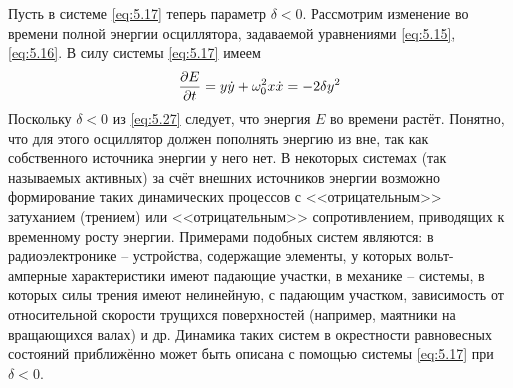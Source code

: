 Пусть в системе \eqref{eq:5.17} теперь параметр $\delta<0$. Рассмотрим изменение во времени полной энергии осциллятора, задаваемой уравнениями \eqref{eq:5.15}, \eqref{eq:5.16}. В силу системы \eqref{eq:5.17} имеем
\begin{equation}
        \label{eq:5.27}
        \pdv{E}{t} = y \dot y + \omega_0^2 x \dot x = - 2\delta y^2
\end{equation}
Поскольку $\delta<0$ из \eqref{eq:5.27} следует, что энергия $E$ во времени растёт. Понятно, что для этого осциллятор должен пополнять энергию из вне, так как собственного источника энергии у него нет. В некоторых системах (так называемых активных) за счёт внешних источников энергии возможно формирование таких динамических процессов с <<отрицательным>> затуханием (трением) или <<отрицательным>> сопротивлением, приводящих к временному росту энергии.
Примерами подобных систем являются: в радиоэлектронике -- устройства,
содержащие элементы, у которых вольт-амперные характеристики имеют
падающие участки, в механике --  системы, в которых силы трения имеют
нелинейную, с падающим участком, зависимость от относительной скорости
трущихся поверхностей (например, маятники на вращающихся валах) и др.
Динамика таких систем в окрестности равновесных состояний приближённо
может быть описана с помощью системы \eqref{eq:5.17} при $\delta<0$.

